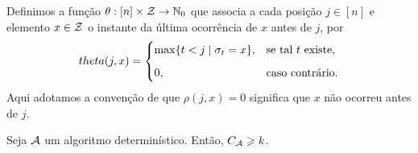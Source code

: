 \begin{definition}
Definimos a função \(\theta : [n] \times \mathcal{Z} \to \mathbb{N}_0\) que associa a cada posição \(j \in [n]\) e elemento \(x \in \mathcal{Z}\) o instante da última ocorrência de \(x\) antes de \(j\), por
\begin{equation}
\\theta(j, x) =
\begin{cases}
  \max\{ t < j \mid \sigma_t = x \}, & \text{se tal } t \text{ existe}, \\[6pt]
  0, & \text{caso contrário}.
\end{cases}
\end{equation}
Aqui adotamos a convenção de que \(\rho(j,x)=0\) significa que \(x\) não ocorreu antes de \(j\).
\end{definition}

\begin{theorem}
\label{teo:cota_det}
Seja \(\mathcal{A}\) um algoritmo determinístico. Então, \(C_{\mathcal{A}} \geqslant k\).
\end{theorem}

